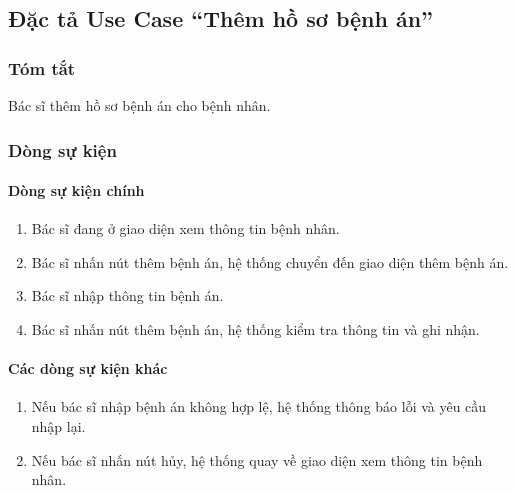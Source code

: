 \subsection{Đặc tả Use Case ``Thêm hồ sơ bệnh án''}

\subsubsection{Tóm tắt}
Bác sĩ thêm hồ sơ bệnh án cho bệnh nhân.

\subsubsection{Dòng sự kiện}
\paragraph{\textbf{Dòng sự kiện chính}}
\begin{enumerate}
  \item Bác sĩ đang ở giao diện xem thông tin bệnh nhân.
  \item Bác sĩ nhấn nút thêm bệnh án, hệ thống chuyển đến giao diện thêm bệnh án.
  \item Bác sĩ nhập thông tin bệnh án.
  \item Bác sĩ nhấn nút thêm bệnh án, hệ thống kiểm tra thông tin và ghi nhận.
\end{enumerate}

\paragraph{\textbf{Các dòng sự kiện khác}}
\begin{enumerate}
  \item Nếu bác sĩ nhập bệnh án không hợp lệ, hệ thống thông báo lỗi và yêu cầu nhập lại.
  \item Nếu bác sĩ nhấn nút hủy, hệ thống quay về giao diện xem thông tin bệnh nhân.
\end{enumerate}

